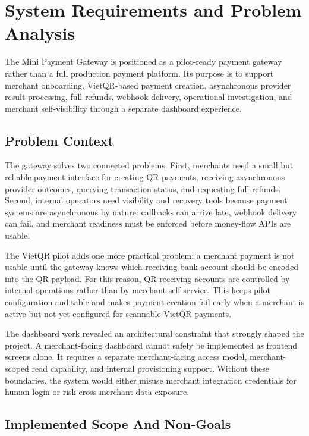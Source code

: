 \chapter{System Requirements and Problem Analysis}

The Mini Payment Gateway is positioned as a pilot-ready payment gateway rather
than a full production payment platform. Its purpose is to support merchant
onboarding, VietQR-based payment creation, asynchronous provider result
processing, full refunds, webhook delivery, operational investigation, and
merchant self-visibility through a separate dashboard experience.

\section{Problem Context}

The gateway solves two connected problems. First, merchants need a small but
reliable payment interface for creating QR payments, receiving asynchronous
provider outcomes, querying transaction status, and requesting full refunds.
Second, internal operators need visibility and recovery tools because payment
systems are asynchronous by nature: callbacks can arrive late, webhook delivery
can fail, and merchant readiness must be enforced before money-flow APIs are
usable.

The VietQR pilot adds one more practical problem: a merchant payment is not
usable until the gateway knows which receiving bank account should be encoded
into the QR payload. For this reason, QR receiving accounts are controlled by
internal operations rather than by merchant self-service. This keeps pilot
configuration auditable and makes payment creation fail early when a merchant
is active but not yet configured for scannable VietQR payments.

The dashboard work revealed an architectural constraint that strongly shaped the
project. A merchant-facing dashboard cannot safely be implemented as frontend
screens alone. It requires a separate merchant-facing access model, merchant-
scoped read capability, and internal provisioning support. Without these
boundaries, the system would either misuse merchant integration credentials for
human login or risk cross-merchant data exposure.

\section{Implemented Scope And Non-Goals}

